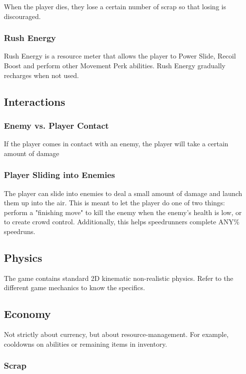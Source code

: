 \documentclass[12pt]{article}
\begin{document}
When the player dies, they lose a certain number of scrap so that losing is discouraged.

\subsubsection{Rush Energy}

Rush Energy is a resource meter that allows the player to Power Slide, Recoil Boost and perform other Movement Perk abilities. Rush Energy gradually recharges when not used. 

\subsection{Interactions}

\subsubsection{Enemy vs. Player Contact}

If the player comes in contact with an enemy, the player will take a certain amount of damage

\subsubsection{Player Sliding into Enemies}

The player can slide into enemies to deal a small amount of damage and launch them up into the air. This is meant to let the player do one of two things: perform a "finishing move" to kill the enemy when the enemy's health is low, or to create crowd control. Additionally, this helps speedrunners complete ANY\% speedruns. 

\subsection{Physics}

The game contains standard 2D kinematic non-realistic physics. Refer to the different game mechanics to know the specifics.

\subsection{Economy}

Not strictly about currency, but about resource-management. For example, cooldowns on abilities or remaining items in inventory. 

\subsubsection{Scrap}
\end{document}
